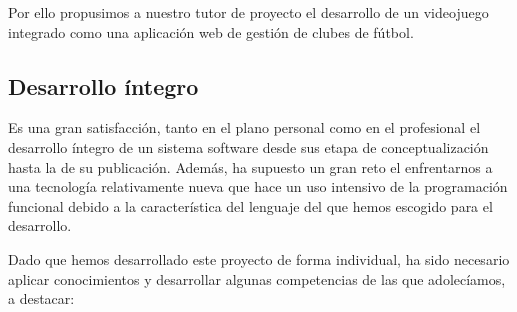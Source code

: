 Por ello propusimos a nuestro tutor de proyecto el desarrollo de un videojuego
integrado como una aplicación web de gestión de clubes de fútbol.

\subsection{Desarrollo íntegro}
Es una gran satisfacción, tanto en el plano personal como en el profesional el
desarrollo íntegro de un sistema software desde sus etapa de conceptualización
hasta la de su publicación. Además, ha supuesto un gran reto el enfrentarnos a
una tecnología relativamente nueva que hace un uso intensivo de la programación
funcional debido a la característica del lenguaje del  que
hemos escogido para el desarrollo.

Dado que hemos desarrollado este proyecto de forma individual, ha sido necesario
aplicar conocimientos y desarrollar algunas competencias de las que adolecíamos,
a destacar:


